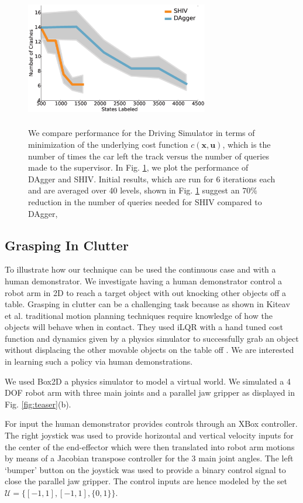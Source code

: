 \documentclass[10pt, conference]{ieeeconf}      %
\newcommand{\bu}{\mathbf{u}}
\newcommand{\bx}{\mathbf{x}}
\begin{document}
\begin{figure}[t!]
\centering
\includegraphics[width=8cm, height=6cm]{figures/dagger_shiv_one_class.eps}
\caption{We compare performance for the Driving Simulator in terms of minimization of the underlying cost function $c(\bx,\bu)$, which is the  number of times the car left the track versus the number of queries made to the supervisor. In Fig. \ref{fig:car_cost}, we plot the performance of DAgger and SHIV.  Initial results, which are run for 6 iterations each and are averaged over 40 levels, shown in Fig. \ref{fig:car_cost} suggest an $70\%$ reduction in the number of queries needed for SHIV compared to DAgger,}
\vspace*{-10pt}
\label{fig:car_cost}
\end{figure}


\subsection{Grasping In Clutter}
To illustrate how our technique can be used the continuous case and with a human demonstrator. 
We investigate having a human demonstrator control a robot arm in 2D to reach a target object with out knocking other objects off a table. Grasping in clutter can be a challenging task because as shown in Kiteav et al. traditional motion planning techniques require knowledge of how the objects will behave when in contact. They used iLQR with a hand tuned cost function and dynamics given by a physics simulator to successfully grab an object without displacing the other movable objects on the table off \cite{kitaevphysics}. We are interested in learning such a policy via human demonstrations.   

We used Box2D a physics simulator to model a virtual world. We simulated a 4 DOF robot arm with three main joints and a parallel jaw gripper as
displayed in Fig. \ref{fig:teaser}(b). 

For input the human demonstrator provides controls through an XBox controller. The right joystick was used to
    provide horizontal and vertical velocity inputs for the center of the end-effector which were then translated into
robot arm motions by means of a Jacobian transpose controller for the 3 main joint angles. The left `bumper' button on the joystick was used to provide a binary control signal to close the parallel jaw
gripper. The control inputs are hence modeled by the set $\mathcal{U} = \lbrace [-1,1],[-1,1],\lbrace 0,1 \rbrace \rbrace$.  
\end{document}

